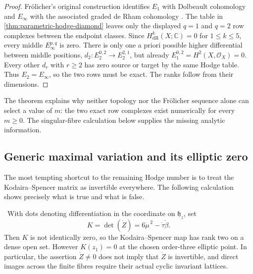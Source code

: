 \begin{proof}
Fr\"olicher's original construction identifies $E_1$ with Dolbeault
cohomology and $E_\infty$ with the associated graded de Rham cohomology
\cite[p.~643, Lemmas~1--2 and Theorem~3]{Frolicher1955}.  The table in
\cref{thm:parametric-hodge-diamond} leaves only the displayed
$q=1$ and $q=2$ row complexes between the endpoint classes.  Since
$H^k_{\mathrm{dR}}(X;\mathbb C)=0$ for $1\le k\le5$, every middle
$E_\infty^{p,q}$ is zero.  There is only one a priori possible higher
differential between middle positions,
$d_2:E_2^{0,2}\to E_2^{2,1}$, but already
$E_1^{0,2}=H^2(X,\mathcal O_X)=0$.  Every other $d_r$ with $r\ge2$ has
zero source or target by the same Hodge table.  Thus $E_2=E_\infty$, so the
two rows must be exact.  The ranks follow from their dimensions.
\end{proof}

The theorem explains why neither topology nor the Fr\"olicher sequence alone
can select a value of $m$: the two exact row complexes exist numerically for
every $m\ge0$.  The singular-fibre calculation below supplies the missing
analytic information.

\subsection{Generic maximal variation and its elliptic zero}

The most tempting shortcut to the remaining Hodge number is to treat the
Kodaira--Spencer matrix as invertible everywhere.  The following calculation
shows precisely what is true and what is false.

\begin{proposition}
\label{prop:period-derivative-determinant}
\Verified\ With dots denoting differentiation in the coordinate on
$\mathfrak h_z$, set
\[
 K=\det(\dot Z)=6\dot\mu^{\,2}-\dot\tau\dot\beta.
\]
Then $K$ is not identically zero, so the Kodaira--Spencer map has rank two
on a dense open set.  However $K(z_1)=0$ at the chosen order-three elliptic
point.  In particular, the assertion $\dot Z\ne0$ does not imply that
$\dot Z$ is invertible, and direct images across the finite fibres require
their actual cyclic invariant lattices.
\end{proposition}

